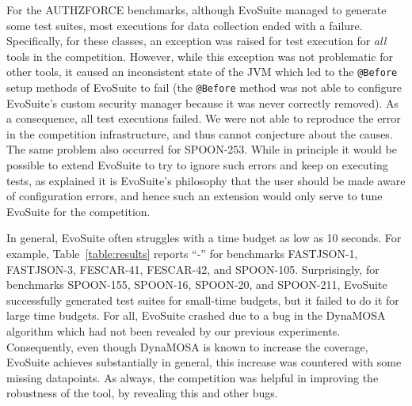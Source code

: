 \documentclass[sigconf,table]{acmart}
\newcommand{\TODO}[1]{\textbf{\textcolor{ScarletRed}{[TODO: #1]}}\xspace}
\newcommand{\TODO}[1]{}
\newcommand{\EVOSUITE}{{\sc EvoSuite}\xspace}
\begin{document}
For the AUTHZFORCE benchmarks, although \EVOSUITE managed to generate
some test suites, most executions for data collection ended with a
failure. Specifically, for these classes, an exception was raised for
test execution for \emph{all} tools in the competition. However,
while this exception was not problematic for other tools, it caused
an inconsistent state of the JVM which led to the \texttt{@Before}
setup methods of \EVOSUITE to fail (the \texttt{@Before} method was
not able to configure \EVOSUITE's custom security manager because it
was never correctly removed). As a consequence, all test executions
failed. We were not able to reproduce the error in the competition
infrastructure, and thus cannot conjecture about the causes. The same
problem also occurred for SPOON-253. While in principle it would be
possible to extend \EVOSUITE to try to ignore such errors and keep on
executing tests, as explained it is \EVOSUITE's philosophy that the
user should be made aware of configuration errors, and hence such an
extension would only serve to tune \EVOSUITE for the competition.

In general, \EVOSUITE often struggles with a time budget as low as 10
seconds. For example, Table~\ref{table:results} reports ``-'' for
benchmarks FASTJSON-1, FASTJSON-3, FESCAR-41, FESCAR-42, and
SPOON-105.
%
Surprisingly, for benchmarks SPOON-155, SPOON-16, SPOON-20, and
SPOON-211, \EVOSUITE successfully generated test suites for small-time 
budgets, but it failed to do it for large time budgets. For all,
\EVOSUITE crashed due to a bug in the DynaMOSA algorithm which had
not been revealed by our previous experiments. Consequently, even
though DynaMOSA is known to increase the coverage, \EVOSUITE achieves
substantially in general, this increase was countered with some
missing datapoints. As always, the competition was helpful in
improving the robustness of the tool, by revealing this and other
bugs.
\end{document}
